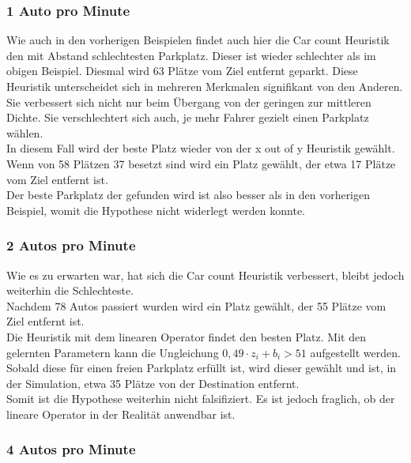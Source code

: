   \subsubsection{1 Auto pro Minute}
  
Wie auch in den vorherigen Beispielen findet auch hier die Car count Heuristik den mit Abstand schlechtesten Parkplatz. 
Dieser ist wieder schlechter als im obigen Beispiel. Diesmal wird 63 Plätze vom Ziel entfernt geparkt. Diese Heuristik unterscheidet sich in mehreren Merkmalen signifikant von den Anderen. Sie verbessert sich nicht nur beim Übergang von der geringen zur mittleren Dichte. Sie verschlechtert sich auch, je mehr Fahrer gezielt einen Parkplatz wählen.\\
In diesem Fall wird der beste Platz wieder von der x out of y Heuristik gewählt. 
Wenn von 58 Plätzen 37 besetzt sind wird ein Platz gewählt, der etwa 17 Plätze vom Ziel entfernt ist. \\
Der beste Parkplatz der gefunden wird ist also besser als in den vorherigen Beispiel, womit die Hypothese nicht widerlegt werden konnte.\\

\subsubsection{2 Autos pro Minute}

Wie es zu erwarten war, hat sich die Car count Heuristik verbessert, bleibt jedoch weiterhin die Schlechteste.\\
Nachdem 78 Autos passiert wurden wird ein Platz gewählt, der 55 Plätze vom Ziel entfernt ist.\\
Die Heuristik mit dem linearen Operator findet den besten Platz. 
Mit den gelernten Parametern kann die Ungleichung $0,49\cdot z_i+b_i > 51$ aufgestellt werden. Sobald diese für einen freien Parkplatz erfüllt ist, wird dieser gewählt und ist, in der Simulation, etwa 35 Plätze von der Destination entfernt.\\
Somit ist die Hypothese weiterhin nicht falsifiziert. Es ist jedoch fraglich, ob der lineare Operator in der Realität anwendbar ist. \\

\subsubsection{4 Autos pro Minute}

